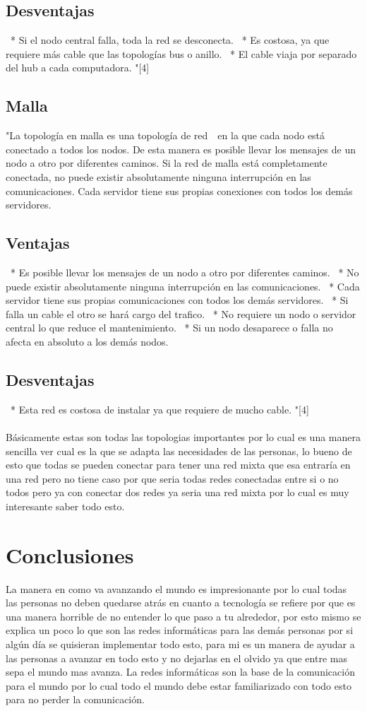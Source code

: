 \documentclass{bmcart}
\begin{document}
\subsection*{Desventajas}
 * Si el nodo central falla, toda la red se desconecta.
 * Es costosa, ya que requiere más cable que las topologías bus o anillo.
 * El cable viaja por separado del hub a cada computadora.
"[4]  
\subsection*{Malla} 
"La topología en malla es una topología de red  en la que cada nodo está conectado a todos los
nodos. De esta manera es posible llevar los mensajes de un nodo a otro por diferentes caminos. Si
la red de malla está completamente conectada, no puede existir absolutamente ninguna
interrupción en las comunicaciones. Cada servidor tiene sus propias conexiones con todos los
demás servidores.
\subsection*{Ventajas}
 * Es posible llevar los mensajes de un nodo a otro por diferentes caminos.
 * No puede existir absolutamente ninguna interrupción en las comunicaciones.
 * Cada servidor tiene sus propias comunicaciones con todos los demás servidores.
 * Si falla un cable el otro se hará cargo del trafico.
 * No requiere un nodo o servidor central lo que reduce el mantenimiento.
 * Si un nodo desaparece o falla no afecta en absoluto a los demás nodos.
\subsection*{Desventajas}
 * Esta red es costosa de instalar ya que requiere de mucho cable.
"[4]\\
\\Básicamente estas son todas las topologias importantes por lo cual es una manera sencilla ver cual es la que se adapta las necesidades de las personas, lo bueno de esto que todas se pueden conectar para tener una red mixta que esa entraría en una red pero no tiene caso por que seria todas redes conectadas entre si o no todos pero ya con conectar dos redes ya seria una red mixta por lo cual es muy interesante saber todo esto. 
       

   
\section*{Conclusiones}
La manera en como va avanzando el mundo es impresionante por lo cual todas las personas no deben quedarse atrás en cuanto a tecnología se refiere por que es una manera horrible de no entender lo que paso a tu alrededor, por esto mismo se explica un poco lo que son las redes informáticas para las demás personas por si algún día se quisieran implementar todo esto, para mi es un manera de ayudar a las personas a avanzar en todo esto y no dejarlas en el olvido ya que entre mas sepa el mundo mas avanza. La redes informáticas son la base de la comunicación para el mundo por lo cual todo el mundo debe estar familiarizado con todo esto para no perder la comunicación.     
\end{document}
